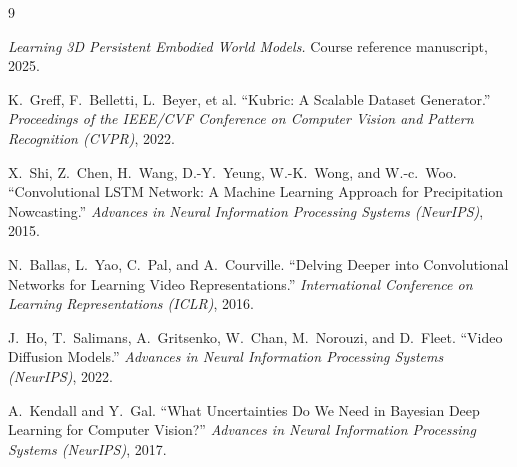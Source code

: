 \documentclass[11pt]{article}
\begin{document}
\begin{thebibliography}{9}

\emph{Learning 3D Persistent Embodied World Models.}
Course reference manuscript, 2025.

K.~Greff, F.~Belletti, L.~Beyer, et al.
``Kubric: A Scalable Dataset Generator.''
\emph{Proceedings of the IEEE/CVF Conference on Computer Vision and
Pattern Recognition (CVPR)}, 2022.

X.~Shi, Z.~Chen, H.~Wang, D.-Y.~Yeung, W.-K.~Wong, and W.-c.~Woo.
``Convolutional LSTM Network: A Machine Learning Approach for
Precipitation Nowcasting.''
\emph{Advances in Neural Information Processing Systems (NeurIPS)},
2015.

N.~Ballas, L.~Yao, C.~Pal, and A.~Courville.
``Delving Deeper into Convolutional Networks for Learning Video
Representations.''
\emph{International Conference on Learning Representations (ICLR)},
2016.

J.~Ho, T.~Salimans, A.~Gritsenko, W.~Chan, M.~Norouzi, and D.~Fleet.
``Video Diffusion Models.''
\emph{Advances in Neural Information Processing Systems (NeurIPS)},
2022.

A.~Kendall and Y.~Gal.
``What Uncertainties Do We Need in Bayesian Deep Learning for
Computer Vision?''
\emph{Advances in Neural Information Processing Systems (NeurIPS)},
2017.

\end{thebibliography}
\end{document}
